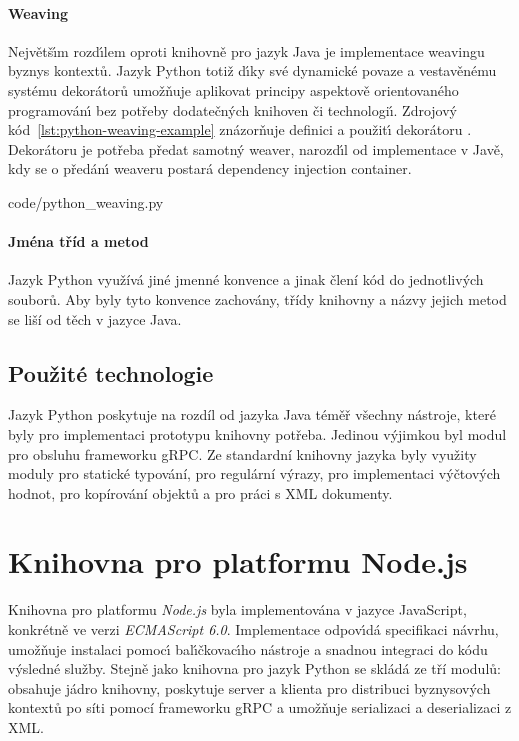 \paragraph{Weaving} Největš\'{\i}m rozd\'{\i}lem oproti knihovně pro
jazyk Java je implementace weavingu byznys kontextů.
Jazyk Python totiž d\'{\i}ky své dynamické povaze a vestavěnému
systému dekorátorů umožňuje aplikovat principy aspektově orientovaného
programován\'{\i} bez potřeby dodatečn\'ych knihoven či technologi\'{\i}.
Zdrojov\'y kód~\ref{lst:python-weaving-example} znázorňuje
definici a použit\'{\i} dekorátoru .
Dekorátoru je potřeba předat samotn\'y weaver, narozd\'{\i}l
od implementace v Javě, kdy se o předán\'{\i} weaveru postará dependency
injection container.


{code/python_weaving.py}

\paragraph{Jména tříd a metod} Jazyk Python využívá jiné jmenné konvence
a jinak člení kód do jednotlivých souborů. Aby byly tyto konvence zachovány,
třídy knihovny a názvy jejich metod se liší od těch v jazyce Java.

\subsection{Použité technologie}

Jazyk Python poskytuje na rozdíl od jazyka Java téměř všechny nástroje, které byly pro implementaci
prototypu knihovny potřeba. Jedinou výjimkou byl modul pro obsluhu frameworku gRPC.
Ze standardní knihovny jazyka byly využity moduly  pro statické typování,
 pro regulární výrazy,  pro implementaci výčtových hodnot,  pro
kopírování objektů a  pro práci s XML dokumenty.

\section{Knihovna pro platformu Node.js}

Knihovna pro platformu \textit{Node.js} byla implementována
v jazyce JavaScript, konkrétně ve verzi \textit{ECMAScript 6.0}.
Implementace odpov\'{\i}dá specifikaci návrhu, umožňuje
instalaci pomoc\'{\i} bal\'{\i}čkovac\'{\i}ho nástroje a snadnou
integraci do kódu v\'ysledné služby. Stejně jako knihovna
pro jazyk Python se skládá ze tří modulů:  obsahuje
jádro knihovny,  poskytuje server a klienta pro distribuci
byznysových kontextů po síti pomocí frameworku gRPC a  umožňuje
serializaci a deserializaci z XML.

